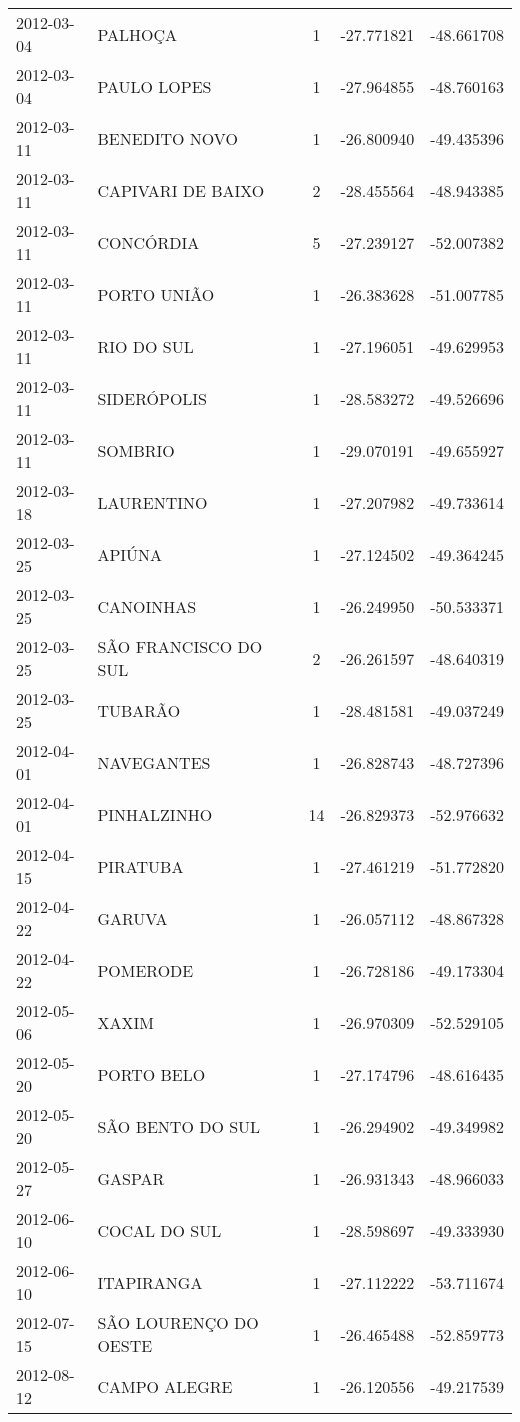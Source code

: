 \documentclass[
	12pt,				%
	openright,			%
	oneside,			%
	a4paper,			%
	english,			%
	french,				%
	spanish,			%
	brazil				%
	dvipsnames, table]{abntex2}
\begin{document}
\begin{longtable}[htbp]{llcrr}
2012-03-04 & PALHOÇA & 1 & -27.771821 & -48.661708 \\
2012-03-04 & PAULO LOPES & 1 & -27.964855 & -48.760163 \\
2012-03-11 & BENEDITO NOVO & 1 & -26.800940 & -49.435396 \\
2012-03-11 & CAPIVARI DE BAIXO & 2 & -28.455564 & -48.943385 \\
2012-03-11 & CONCÓRDIA & 5 & -27.239127 & -52.007382 \\
2012-03-11 & PORTO UNIÃO & 1 & -26.383628 & -51.007785 \\
2012-03-11 & RIO DO SUL & 1 & -27.196051 & -49.629953 \\
2012-03-11 & SIDERÓPOLIS & 1 & -28.583272 & -49.526696 \\
2012-03-11 & SOMBRIO & 1 & -29.070191 & -49.655927 \\
2012-03-18 & LAURENTINO & 1 & -27.207982 & -49.733614 \\
2012-03-25 & APIÚNA & 1 & -27.124502 & -49.364245 \\
2012-03-25 & CANOINHAS & 1 & -26.249950 & -50.533371 \\
2012-03-25 & SÃO FRANCISCO DO SUL & 2 & -26.261597 & -48.640319 \\
2012-03-25 & TUBARÃO & 1 & -28.481581 & -49.037249 \\
2012-04-01 & NAVEGANTES & 1 & -26.828743 & -48.727396 \\
2012-04-01 & PINHALZINHO & 14 & -26.829373 & -52.976632 \\
2012-04-15 & PIRATUBA & 1 & -27.461219 & -51.772820 \\
2012-04-22 & GARUVA & 1 & -26.057112 & -48.867328 \\
2012-04-22 & POMERODE & 1 & -26.728186 & -49.173304 \\
2012-05-06 & XAXIM & 1 & -26.970309 & -52.529105 \\
2012-05-20 & PORTO BELO & 1 & -27.174796 & -48.616435 \\
2012-05-20 & SÃO BENTO DO SUL & 1 & -26.294902 & -49.349982 \\
2012-05-27 & GASPAR & 1 & -26.931343 & -48.966033 \\
2012-06-10 & COCAL DO SUL & 1 & -28.598697 & -49.333930 \\
2012-06-10 & ITAPIRANGA & 1 & -27.112222 & -53.711674 \\
2012-07-15 & SÃO LOURENÇO DO OESTE & 1 & -26.465488 & -52.859773 \\
2012-08-12 & CAMPO ALEGRE & 1 & -26.120556 & -49.217539 \\

\end{longtable}
\end{document}
